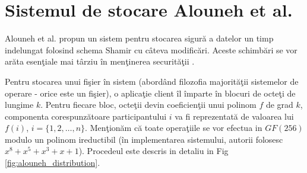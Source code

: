 \documentclass{llncs}
\begin{document}
\section{Sistemul de stocare Alouneh et al.}
\label{sec:desc_alouneh}

Alouneh et al. propun un sistem pentru stocarea sigur\u{a} a datelor un timp indelungat folosind schema Shamir cu c\^{a}teva modific\u{a}ri. Aceste schimb\u{a}ri se vor ar\u{a}ta esen\c{t}iale mai t\^{a}rziu \^{i}n men\c{t}inerea securit\u{a}\c{t}ii \cite{AAMK:2013}.

Pentru stocarea unui fi\c{s}ier \^{i}n sistem (abord\^{a}nd filozofia majorit\u{a}\c{t}ii sistemelor de operare - orice este un fi\c{s}ier), o aplica\c{t}ie client \^{i}l \^{i}mparte \^{i}n blocuri de octe\c{t}i de lungime $k$. Pentru fiecare bloc, octe\c{t}ii devin coeficien\c{t}ii unui polinom $f$ de grad $k$, componenta corespunz\u{a}toare participantului $i$ va fi reprezentat\u{a} de valoarea lui $f(i)$, $i = \{1,2,\dots, n\}$. 
Men\c{t}ion\u{a}m c\u{a} toate opera\c{t}iile se vor efectua in $GF(256)$ modulo un polinom ireductibil (\^{i}n implementarea sistemului, autorii folosesc $x^8 + x^5 + x^3 + x + 1$). Procedeul este descris in detaliu in Fig \ref{fig:alouneh_distribution}.
\end{document}

